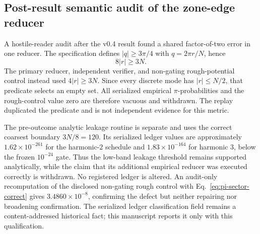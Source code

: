 \subsection{Post-result semantic audit of the zone-edge reducer}
\label{sec:post-result-audit}

A hostile-reader audit after the v0.4 result found a shared factor-of-two error
in one reducer.  The specification defines $|q|\ge3\pi/4$ with
$q=2\pi r/N$, hence
\begin{equation}
 8|r|\ge3N.
 \label{eq:pi-sector-correct}
\end{equation}
The primary reducer, independent verifier, and non-gating rough-potential
control instead used $4|r|\ge3N$.  Since every discrete mode has
$|r|\le N/2$, that predicate selects an empty set.  All serialized empirical
$\pi$-probabilities and the rough-control value zero are therefore vacuous and
withdrawn.  The replay duplicated the predicate and is not independent evidence
for this metric.

The pre-outcome analytic leakage routine is separate and uses the correct
coarsest boundary $3N/8=120$.  Its serialized ledger values are approximately
$1.62\times10^{-261}$ for the harmonic-$2$ schedule and
$1.83\times10^{-164}$ for harmonic $3$, below the frozen $10^{-24}$ gate.
Thus the low-band leakage threshold remains supported analytically, while the
claim that its additional empirical reducer was executed correctly is
withdrawn.  No registered ledger is altered.  An audit-only recomputation of
the disclosed non-gating rough control with Eq.~\eqref{eq:pi-sector-correct}
gives $3.4860\times10^{-8}$, confirming the defect but neither repairing nor
broadening confirmation.  The serialized ledger classification field remains a
content-addressed historical fact; this manuscript reports it only with this
qualification.
